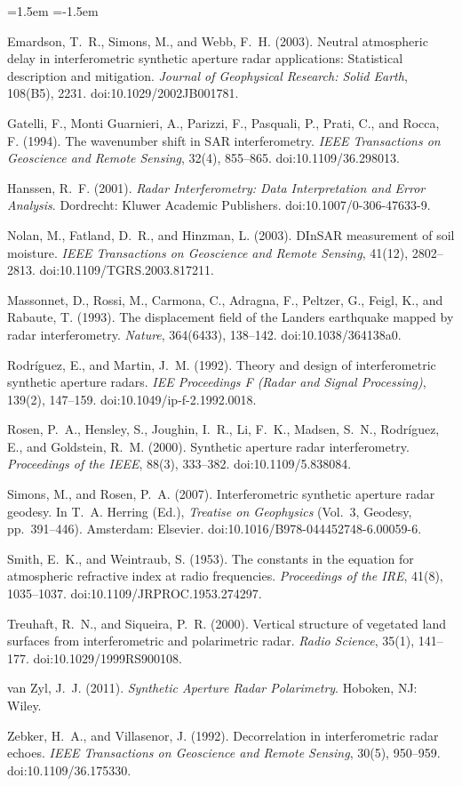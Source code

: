 \documentclass[11pt, oneside]{article}
\begin{document}
{\raggedright
\begin{list}{}{\leftmargin=1.5em \itemindent=-1.5em \itemsep=4pt}
	\item Emardson, T.~R., Simons, M., and Webb, F.~H. (2003). Neutral atmospheric delay in interferometric synthetic aperture radar applications: Statistical description and mitigation. \textit{Journal of Geophysical Research: Solid Earth}, 108(B5), 2231. doi:10.1029/2002JB001781.
	\item Gatelli, F., Monti Guarnieri, A., Parizzi, F., Pasquali, P., Prati, C., and Rocca, F. (1994). The wavenumber shift in SAR interferometry. \textit{IEEE Transactions on Geoscience and Remote Sensing}, 32(4), 855--865. doi:10.1109/36.298013.
	\item Hanssen, R.~F. (2001). \textit{Radar Interferometry: Data Interpretation and Error Analysis}. Dordrecht: Kluwer Academic Publishers. doi:10.1007/0-306-47633-9.
	\item Nolan, M., Fatland, D.~R., and Hinzman, L. (2003). DInSAR measurement of soil moisture. \textit{IEEE Transactions on Geoscience and Remote Sensing}, 41(12), 2802--2813. doi:10.1109/TGRS.2003.817211.
	\item Massonnet, D., Rossi, M., Carmona, C., Adragna, F., Peltzer, G., Feigl, K., and Rabaute, T. (1993). The displacement field of the Landers earthquake mapped by radar interferometry. \textit{Nature}, 364(6433), 138--142. doi:10.1038/364138a0.
	\item Rodr\'iguez, E., and Martin, J.~M. (1992). Theory and design of interferometric synthetic aperture radars. \textit{IEE Proceedings F (Radar and Signal Processing)}, 139(2), 147--159. doi:10.1049/ip-f-2.1992.0018.
	\item Rosen, P.~A., Hensley, S., Joughin, I.~R., Li, F.~K., Madsen, S.~N., Rodr\'iguez, E., and Goldstein, R.~M. (2000). Synthetic aperture radar interferometry. \textit{Proceedings of the IEEE}, 88(3), 333--382. doi:10.1109/5.838084.
	\item Simons, M., and Rosen, P.~A. (2007). Interferometric synthetic aperture radar geodesy. In T.~A. Herring (Ed.), \textit{Treatise on Geophysics} (Vol.~3, Geodesy, pp.~391--446). Amsterdam: Elsevier. doi:10.1016/B978-044452748-6.00059-6.
	\item Smith, E.~K., and Weintraub, S. (1953). The constants in the equation for atmospheric refractive index at radio frequencies. \textit{Proceedings of the IRE}, 41(8), 1035--1037. doi:10.1109/JRPROC.1953.274297.
	\item Treuhaft, R.~N., and Siqueira, P.~R. (2000). Vertical structure of vegetated land surfaces from interferometric and polarimetric radar. \textit{Radio Science}, 35(1), 141--177. doi:10.1029/1999RS900108.
	\item van Zyl, J.~J. (2011). \textit{Synthetic Aperture Radar Polarimetry}. Hoboken, NJ: Wiley.
	\item Zebker, H.~A., and Villasenor, J. (1992). Decorrelation in interferometric radar echoes. \textit{IEEE Transactions on Geoscience and Remote Sensing}, 30(5), 950--959. doi:10.1109/36.175330.
\end{list}
\par}
\end{document}
